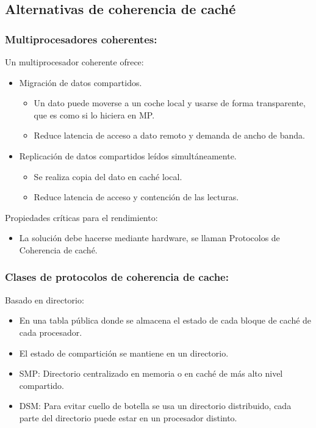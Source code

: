 \documentclass[12pt, twoside, openright]{report} %
\begin{document}
\subsection{Alternativas de coherencia de caché}
\subsubsection{Multiprocesadores coherentes:}



Un multiprocesador coherente ofrece:

\begin{itemize}

	\item Migración de datos compartidos.

	      \begin{itemize}

		      \item Un dato puede moverse a un coche local y usarse de forma
		            transparente, que es como si lo hiciera en MP.
		      \item Reduce latencia de acceso a dato remoto y demanda de ancho
		            de banda.
	      \end{itemize}
	\item Replicación de datos compartidos leídos simultáneamente.

	      \begin{itemize}

		      \item Se realiza copia del dato en caché local.
		      \item Reduce latencia de acceso y contención de las lecturas.
	      \end{itemize}
\end{itemize}

Propiedades críticas para el rendimiento:

\begin{itemize}

	\item La solución debe hacerse mediante hardware, se llaman
	      Protocolos de Coherencia de caché.
\end{itemize}

\subsubsection{Clases de protocolos de coherencia de cache:}
Basado en directorio:

\begin{itemize}

	\item En una tabla pública donde se almacena el estado de cada
	      bloque de caché de cada procesador.
	\item El estado de compartición se mantiene en un directorio.
	\item SMP: Directorio centralizado en memoria o en caché de más alto
	      nivel compartido.
	\item DSM: Para evitar cuello de botella se usa un directorio
	      distribuido, cada parte del directorio puede estar en un
	      procesador distinto.
\end{itemize}
\end{document}
